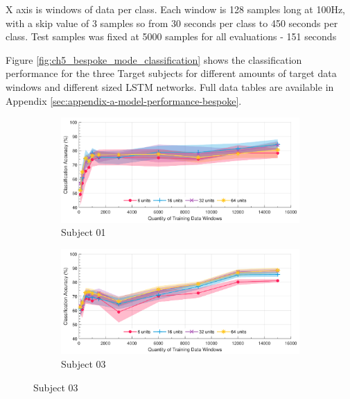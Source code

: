 X axis is windows of data per class. Each window is 128 samples long at 100Hz, with a skip value of 3 samples so from 30 seconds per class to 450 seconds per class. Test samples was fixed at 5000 samples for all evaluations - 151 seconds

Figure \ref{fig:ch5_bespoke_mode_classification} shows the classification performance for the three Target subjects for different amounts of target data windows and different sized LSTM networks. Full data tables are available in Appendix \ref{sec:appendix-a-model-performance-bespoke}.

\begin{figure}[p]
    \centering
    \begin{subfigure}[b]{0.9\textwidth}
        \centering
        \includegraphics[width=\textwidth]{content/5-Personalisation/Bespoke_Target/ch5_bespoke_target_model_subject_1.pdf}
        \caption{Subject 01}
        \label{fig:ch5_6_unit_bespoke_model}
    \end{subfigure}
    \begin{subfigure}[b]{0.9\textwidth}
        \centering
        \includegraphics[width=\textwidth]{content/5-Personalisation/Bespoke_Target/ch5_bespoke_target_model_subject_3.pdf}
        \caption{Subject 03}
        \label{fig:ch5_16_unit_bespoke_model}
    \end{subfigure}

\end{figure}
